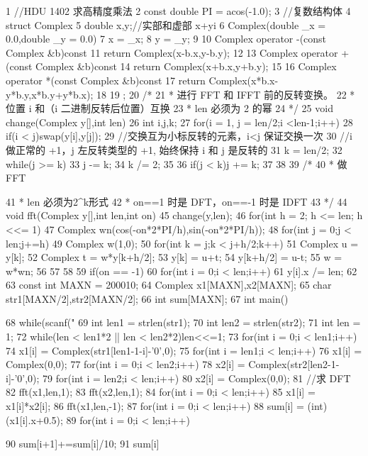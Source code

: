 \documentclass[11pt]{article}
\begin{document}
\begin{Code}
 1   //HDU 1402 求高精度乘法
 2   const double PI = acos(-1.0);
 3   //复数结构体
 4   struct Complex{
 5        double x,y;//实部和虚部 x+yi
 6        Complex(double _x = 0.0,double _y = 0.0){
 7            x = _x;
 8            y = _y;
 9        }
10        Complex operator -(const Complex &b)const{
11            return Complex(x-b.x,y-b.y);
12        }
13        Complex operator +(const Complex &b)const{
14            return Complex(x+b.x,y+b.y);
15        }
16        Complex operator *(const Complex &b)const{
17            return Complex(x*b.x-y*b.y,x*b.y+y*b.x);
18        }
19   };
20   /*
21     * 进行 FFT 和 IFFT 前的反转变换。
22     * 位置 i 和（i 二进制反转后位置）互换
23     * len 必须为 2 的幂
24     */
25   void change(Complex y[],int len){
26        int i,j,k;
27        for(i = 1, j = len/2;i <len-1;i++){
28            if(i < j)swap(y[i],y[j]);
29            //交换互为小标反转的元素，i<j 保证交换一次
30            //i 做正常的 +1，j 左反转类型的 +1, 始终保持 i 和 j 是反转的
31            k = len/2;
32            while(j >= k){
33                j -= k;
34                k /= 2;
35            }
36            if(j < k)j += k;
37        }
38   }
39   /*
40     * 做 FFT


41     * len 必须为2^k形式
42     * on==1 时是 DFT，on==-1 时是 IDFT
43     */
44   void fft(Complex y[],int len,int on){
45        change(y,len);
46        for(int h = 2; h <= len; h <<= 1){
47            Complex wn(cos(-on*2*PI/h),sin(-on*2*PI/h));
48            for(int j = 0;j < len;j+=h){
49                Complex w(1,0);
50                for(int k = j;k < j+h/2;k++){
51                    Complex u = y[k];
52                    Complex t = w*y[k+h/2];
53                    y[k] = u+t;
54                    y[k+h/2] = u-t;
55                    w = w*wn;
56                }
57            }
58        }
59        if(on == -1)
60            for(int i = 0;i < len;i++)
61                y[i].x /= len;
62   }
63   const int MAXN = 200010;
64   Complex x1[MAXN],x2[MAXN];
65   char str1[MAXN/2],str2[MAXN/2];
66   int sum[MAXN];
67   int main(){
68        while(scanf("%
69            int len1 = strlen(str1);
70            int len2 = strlen(str2);
71            int len = 1;
72            while(len < len1*2 || len < len2*2)len<<=1;
73            for(int i = 0;i < len1;i++)
74                x1[i] = Complex(str1[len1-1-i]-'0',0);
75            for(int i = len1;i < len;i++)
76                x1[i] = Complex(0,0);
77            for(int i = 0;i < len2;i++)
78                x2[i] = Complex(str2[len2-1-i]-'0',0);
79            for(int i = len2;i < len;i++)
80                x2[i] = Complex(0,0);
81            //求 DFT
82            fft(x1,len,1);
83            fft(x2,len,1);
84            for(int i = 0;i < len;i++)
85                x1[i] = x1[i]*x2[i];
86            fft(x1,len,-1);
87            for(int i = 0;i < len;i++)
88                sum[i] = (int)(x1[i].x+0.5);
89            for(int i = 0;i < len;i++){
90                sum[i+1]+=sum[i]/10;
91                sum[i]%


}}
\end{Code}
\end{document}
